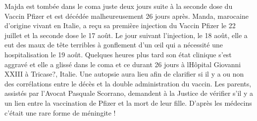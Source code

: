 Majda est tombée dans le coma juste deux jours suite à la seconde dose du Vaccin
Pfizer et est décédée malheureusement 26 jours après. Manda, marocaine d’origine
vivant en Italie, a reçu sa première injection du Vaccin Pfizer le 22 juillet et
la seconde dose le 17 août. Le jour suivant l’injection, le 18 août, elle a eut
des maux de tête terribles à gonflement d’un œil qui a nécessité une
hospitalisation le 19 août. Quelques heures plus tard son état clinique s’est
aggravé et elle a glissé dans le coma et ce durant 26 jours à lHôpital Giovanni
XXIII à Tricase?, Italie. Une autopsie aura lieu afin de clarifier si il y a ou
non des corrélations entre le décès et la double administration du vaccin. Les
parents, assistés par l’Avocat Pasquale Scorrano, demandent à la Justice de
vérifier s’il y a un lien entre la vaccination de Pfizer et la mort de leur
fille. D’après les médecins c’était une rare forme de méningite !

